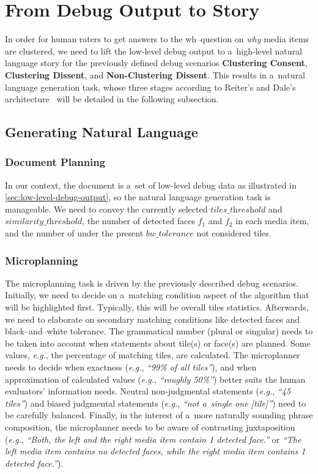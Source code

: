 \documentclass{article}
\begin{document}
\section{From Debug Output to Story}
\label{sec:from-debug-output-to-story}

In order for human raters to get answers to the wh--question
on \emph{why} media items are clustered,
we need to lift the low-level debug output
to a~high-level natural language story
for the previously defined debug scenarios
\textbf{Clustering Consent}, \textbf{Clustering Dissent},
and \textbf{Non-Clustering Dissent}.
This results in a~natural language generation task,
whose three stages according to Reiter's and Dale's architecture~%
\cite{reiter2000building} will be detailed in the following subsection.

\subsection{Generating Natural Language}

\subsubsection{Document Planning}

In our context, the document is a~set of low-level debug data 
as illustrated in \autoref{sec:low-level-debug-output},
so the natural language generation task is manageable.
We need to convey the currently selected $\textit{tiles\_threshold}$
and $\textit{similarity\_threshold}$,
the number of detected faces $f_1$ and $f_2$ in each media item,
and the number of under the present $\textit{bw\_tolerance}$
not considered tiles.

\subsubsection{Microplanning}

The microplanning task is driven by the previously described debug scenarios.
Initially, we need to decide on a~matching condition aspect of the algorithm
that will be highlighted first.
Typically, this will be overall tiles statistics.
Afterwards, we need to elaborate on secondary matching conditions
like detected faces and black--and--white tolerance.
The grammatical number (plural or singular) needs to be taken into account
when statements about tile(s) or face(s) are planned.
Some values, \emph{e.g.}, the percentage of matching tiles, are calculated.
The microplanner needs to decide when exactness
(\emph{e.g.}, \textit{``99\% of all tiles''}),
and when approximation of calculated values
(\emph{e.g.}, \textit{``roughly 50\%''})
better suits the human evaluators' information needs. 
Neutral non-judgmental statements
(\emph{e.g.}, \textit{``45 tiles''})
and biased judgmental statements
(\emph{e.g.}, \textit{``not a~single one [tile]''})
need to be carefully balanced. 
Finally, in the interest of a~more naturally sounding phrase composition,
the microplanner needs to be aware of contrasting juxtaposition
(\emph{e.g.}, \textit{``Both, the left and the right media item contain 1 detected face.''} or
\textit{``The left media item contains no detected faces, while the right media item contains 1 detected face.''}).
\end{document}
